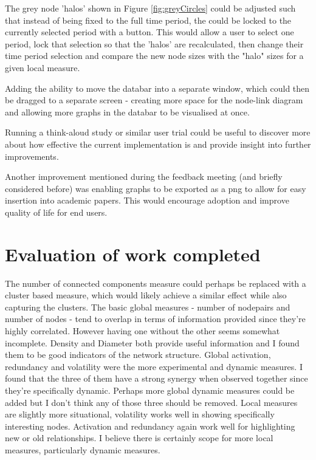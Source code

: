 The grey node 'halos' shown in Figure \ref{fig:greyCircles} could be adjusted such that instead of being fixed to the full time period, the could be locked to the currently selected period with a button. This would allow a user to select one period, lock that selection so that the 'halos' are recalculated, then change their time period selection and compare the new node sizes with the "halo" sizes for a given local measure.
\newline

Adding the ability to move the databar into a separate window, which could then be dragged to a separate screen - creating more space for the node-link diagram and allowing more graphs in the databar to be visualised at once. 
\newline

Running a think-aloud study or similar user trial could be useful to discover more about how effective the current implementation is and provide insight into further improvements.
\newline

Another improvement mentioned during the feedback meeting (and briefly considered before) was enabling graphs to be exported as a png to allow for easy insertion into academic papers. This would encourage adoption and improve quality of life for end users.
\newline


\section{Evaluation of work completed} 
The number of connected components measure could perhaps be replaced with a cluster based measure, which would likely achieve a similar effect while also capturing the clusters. The basic global measures - number of nodepairs and number of nodes - tend to overlap in terms of information provided since they're highly correlated. However having one without the other seems somewhat incomplete. Density and Diameter both provide useful information and I found them to be good indicators of the network structure. Global activation, redundancy and volatility were the more experimental and dynamic measures. I found that the three of them have a strong synergy when observed together since they're specifically dynamic. Perhaps more global dynamic measures could be added but I don't think any of those three should be removed. Local measures are slightly more situational, volatility works well in showing specifically interesting nodes. Activation and redundancy again work well for highlighting new or old relationships. I believe there is certainly scope for more local measures, particularly dynamic measures.

